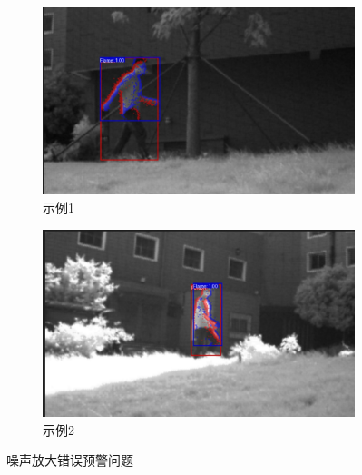 \begin{figure}[ht]
    \centering
    \begin{subfigure}{0.49\textwidth}
        \centering
        \includegraphics[width=\textwidth]{figures/zaosheng3.png}
        \caption{示例1}
        \label{23.a}
    \end{subfigure}
    \hfill
    \begin{subfigure}{0.49\textwidth}
        \centering
        \includegraphics[width=\textwidth]{figures/zaosheng4.png}
        \caption{示例2}
        \label{23.b}
    \end{subfigure}
    \caption{噪声放大错误预警问题}
    \label{23}
\end{figure}

